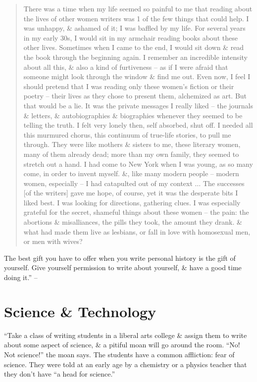 \documentclass{article}
\begin{document}
\begin{quotation}
	There was a time when my life seemed so painful to me that reading about the lives of other women writers was 1 of the few things that could help. I was unhappy, \& ashamed of it; I was baffled by my life. For several years in my early 30s, I would sit in my armchair reading books about these other lives. Sometimes when I came to the end, I would sit down \& read the book through the beginning again. I remember an incredible intensity about all this, \& also a kind of furtiveness -- as if I were afraid that someone might look through the window \& find me out. Even now, I feel I should pretend that I was reading only these women's fiction or their poetry -- their lives as they chose to present them, alchemized as art. But that would be a lie. It was the private messages I really liked -- the journals \& letters, \& autobiographies \& biographies whenever they seemed to be telling the truth. I felt very lonely then, self absorbed, shut off. I needed all this murmured chorus, this continuum of true-life stories, to pull me through. They were like mothers \& sisters to me, these literary women, many of them already dead; more than my own family, they seemed to stretch out a hand. I had come to New York when I was young, as so many come, in order to invent myself. \&, like many modern people -- modern women, especially -- I had catapulted out of my context $\ldots$ The successes [of the writers] gave me hope, of course, yet it was the desperate bits I liked best. I was looking for directions, gathering clues. I was especially grateful for the secret, shameful things about these women -- the pain: the abortions \& misalliances, the pills they took, the amount they drank. \& what had made them live as lesbians, or fall in love with homosexual men, or men with wives?
\end{quotation}
The best gift you have to offer when you write personal history is the gift of yourself. Give yourself permission to write about yourself, \& have a good time doing it.'' -- \cite[pp. 128--140]{Zinsser2016}


\section{Science \& Technology}
``Take a class of writing students in a liberal arts college \& assign them to write about some aspect of science, \& a pitiful moan will go around the room. ``No! Not science!'' the moan says. The students have a common affliction: fear of science. They were told at an early age by a chemistry or a physics teacher that they don't have ``a head for science.''
\end{document}
